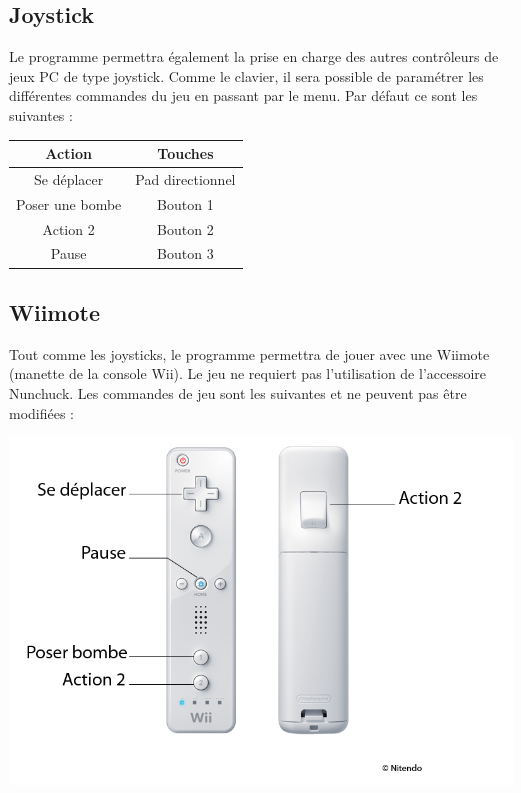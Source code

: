 \subsection{Joystick}

Le programme permettra également la prise en charge des autres contrôleurs de jeux PC de type joystick. Comme le clavier, il sera possible de paramétrer les différentes commandes du jeu en passant par le menu. Par défaut ce sont les suivantes :

\begin{center}
	\begin{tabular}{|c|c|}
		\hline
			\textbf{Action} & \textbf{Touches} \\
		\hline
		Se déplacer & Pad directionnel \\
		\hline
		Poser une bombe & Bouton 1\\
		\hline
		Action 2 & Bouton 2\\
		\hline
		Pause & Bouton 3\\
		\hline
	\end{tabular}
\end{center}


\subsection{Wiimote}

Tout comme les joysticks, le programme permettra de jouer avec une Wiimote (manette de la console Wii). Le jeu ne requiert pas l'utilisation de l'accessoire Nunchuck. Les commandes de jeu sont les suivantes et ne peuvent pas être modifiées :

\begin{center}
	\includegraphics[scale=1.3]{images/wiimote}
\end{center}